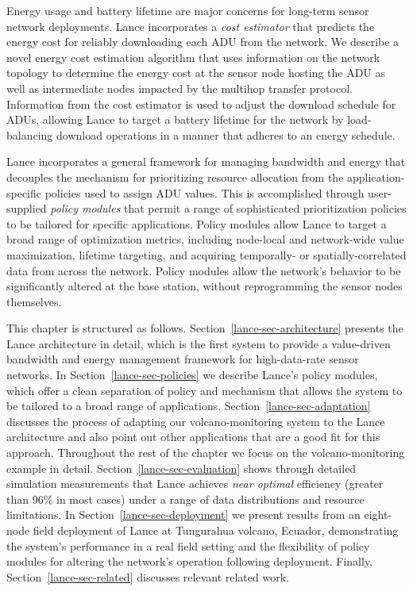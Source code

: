 Energy usage and battery lifetime are major concerns for long-term sensor
network deployments. Lance incorporates a \textit{cost estimator} that predicts
the energy cost for reliably downloading each ADU from the network. We
describe a novel energy cost estimation algorithm that uses information on
the network topology to determine the energy cost at the sensor node hosting
the ADU as well as intermediate nodes impacted by the multihop transfer
protocol. Information from the cost estimator is used to adjust the download
schedule for ADUs, allowing Lance to target a battery lifetime for the
network by load-balancing download operations in a manner that adheres to an
energy schedule.

Lance incorporates a general framework for managing bandwidth and energy that
decouples the mechanism for prioritizing resource allocation from the
application-specific policies used to assign ADU values. This is
accomplished through user-supplied \textit{policy modules} that permit a range
of sophisticated prioritization policies to be tailored for specific
applications. Policy modules allow Lance to target a broad range of
optimization metrics, including node-local and network-wide value
maximization, lifetime targeting, and acquiring temporally- or
spatially-correlated data from across the network. Policy modules allow the
network's behavior to be significantly altered at the base station, without
reprogramming the sensor nodes themselves.

This chapter is structured as follows. Section~\ref{lance-sec-architecture}
presents the Lance architecture in detail, which is the first system to
provide a value-driven bandwidth and energy management framework for
high-data-rate sensor networks. In Section~\ref{lance-sec-policies} we
describe Lance's policy modules, which offer a clean separation of policy and
mechanism that allows the system to be tailored to a broad range of
applications. Section~\ref{lance-sec-adaptation} discusses the process of
adapting our volcano-monitoring system to the Lance architecture and also
point out other applications that are a good fit for this approach.
Throughout the rest of the chapter we focus on the volcano-monitoring example
in detail.  Section~\ref{lance-sec-evaluation} shows through detailed
simulation measurements that Lance achieves \textit{near optimal} efficiency
(greater than 96\% in most cases) under a range of data distributions and
resource limitations. In Section~\ref{lance-sec-deployment} we present
results from an eight-node field deployment of Lance at Tungurahua volcano,
Ecuador, demonstrating the system's performance in a real field setting and
the flexibility of policy modules for altering the network's operation
following deployment. Finally, Section~\ref{lance-sec-related} discusses
relevant related work.
